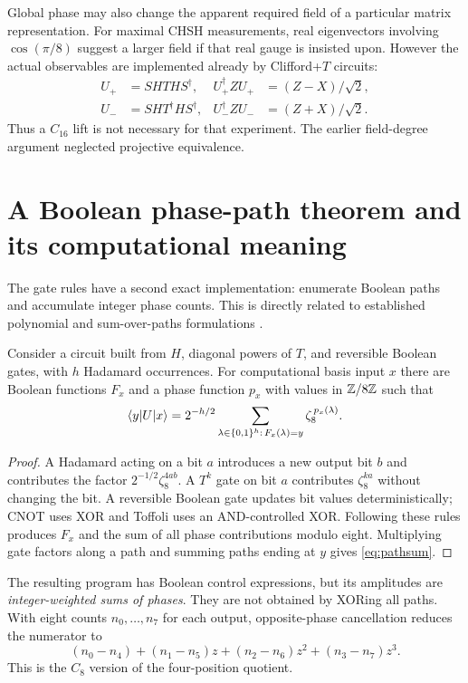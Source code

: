Global phase may also change the apparent required field of a particular matrix representation. For maximal CHSH measurements, real eigenvectors involving $\cos(\pi/8)$ suggest a larger field if that real gauge is insisted upon. However the actual observables are implemented already by Clifford+$T$ circuits:
\begin{align}
 U_+&=SHTHS^\dagger,& U_+^\dagger ZU_+&=(Z-X)/\sqrt2,\\
 U_-&=SHT^\dagger HS^\dagger,& U_-^\dagger ZU_-&=(Z+X)/\sqrt2.
\end{align}
Thus a $C_{16}$ lift is not necessary for that experiment. The earlier field-degree argument neglected projective equivalence.

\section{A Boolean phase-path theorem and its computational meaning}\label{sec:paths}
The gate rules have a second exact implementation: enumerate Boolean paths and accumulate integer phase counts. This is directly related to established polynomial and sum-over-paths formulations \cite{dawson,amy2019,amy2023}.

\begin{theorem}\label{thm:paths}
Consider a circuit built from $H$, diagonal powers of $T$, and reversible Boolean gates, with $h$ Hadamard occurrences. For computational basis input $x$ there are Boolean functions $F_x$ and a phase function $p_x$ with values in $\mathbb Z/8\mathbb Z$ such that
\begin{equation}\label{eq:pathsum}
 \langle y\rvert U\lvert x\rangle=2^{-h/2}
 \sum_{\lambda\in\{0,1\}^h:\,F_x(\lambda)=y}
 \zeta_8^{\,p_x(\lambda)}.
\end{equation}
\end{theorem}
\begin{proof}
A Hadamard acting on a bit $a$ introduces a new output bit $b$ and contributes the factor $2^{-1/2}\zeta_8^{4ab}$. A $T^k$ gate on bit $a$ contributes $\zeta_8^{ka}$ without changing the bit. A reversible Boolean gate updates bit values deterministically; CNOT uses XOR and Toffoli uses an AND-controlled XOR. Following these rules produces $F_x$ and the sum of all phase contributions modulo eight. Multiplying gate factors along a path and summing paths ending at $y$ gives \cref{eq:pathsum}.
\end{proof}
The resulting program has Boolean control expressions, but its amplitudes are \emph{integer-weighted sums of phases}. They are not obtained by XORing all paths. With eight counts $n_0,\ldots,n_7$ for each output, opposite-phase cancellation reduces the numerator to
\begin{equation}
 (n_0-n_4)+(n_1-n_5)z+(n_2-n_6)z^2+(n_3-n_7)z^3.
\end{equation}
This is the $C_8$ version of the four-position quotient.

